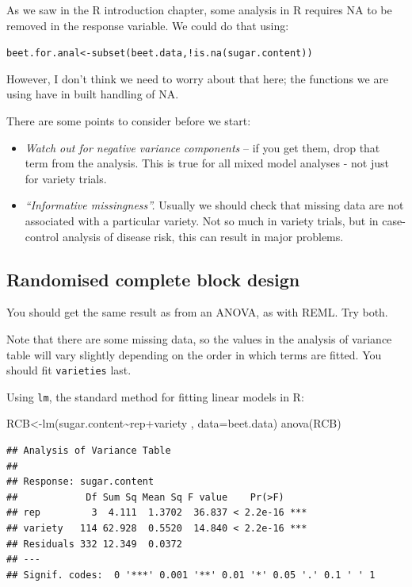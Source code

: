\documentclass[
]{book}
\newenvironment{Shaded}{\begin{snugshade}}{\end{snugshade}}
\newcommand{\AttributeTok}[1]{\textcolor[rgb]{0.77,0.63,0.00}{#1}}
\newcommand{\FunctionTok}[1]{\textcolor[rgb]{0.00,0.00,0.00}{#1}}
\newcommand{\NormalTok}[1]{#1}
\newcommand{\OtherTok}[1]{\textcolor[rgb]{0.56,0.35,0.01}{#1}}
\newcommand{\SpecialCharTok}[1]{\textcolor[rgb]{0.00,0.00,0.00}{#1}}
\begin{document}
As we saw in the R introduction chapter, some analysis in R requires NA to be removed in the response variable. We could do that using:

\texttt{beet.for.anal\textless{}-subset(beet.data,!is.na(sugar.content))}

However, I don't think we need to worry about that here; the functions we are using have in built handling of NA.

There are some points to consider before we start:

\begin{itemize}
\item
  \emph{Watch out for negative variance components} -- if you get them, drop that term from the analysis. This is true for all mixed model analyses - not just for variety trials.
\item
  \emph{``Informative missingness''.} Usually we should check that missing data are not associated with a particular variety. Not so much in variety trials, but in case-control analysis of disease risk, this can result in major problems.
\end{itemize}

\hypertarget{randomised-complete-block-design}{%
\subsection{Randomised complete block design}\label{randomised-complete-block-design}}

You should get the same result as from an ANOVA, as with REML. Try both.

Note that there are some missing data, so the values in the analysis of variance table will vary slightly depending on the order in which terms are fitted. You should fit \texttt{varieties} last.

Using \texttt{lm}, the standard method for fitting linear models in R:

\begin{Shaded}
\begin{Highlighting}[]
\NormalTok{RCB}\OtherTok{\textless{}{-}}\FunctionTok{lm}\NormalTok{(sugar.content}\SpecialCharTok{\textasciitilde{}}\NormalTok{rep}\SpecialCharTok{+}\NormalTok{variety , }\AttributeTok{data=}\NormalTok{beet.data)}
\FunctionTok{anova}\NormalTok{(RCB)}
\end{Highlighting}
\end{Shaded}

\begin{verbatim}
## Analysis of Variance Table
## 
## Response: sugar.content
##            Df Sum Sq Mean Sq F value    Pr(>F)    
## rep         3  4.111  1.3702  36.837 < 2.2e-16 ***
## variety   114 62.928  0.5520  14.840 < 2.2e-16 ***
## Residuals 332 12.349  0.0372                      
## ---
## Signif. codes:  0 '***' 0.001 '**' 0.01 '*' 0.05 '.' 0.1 ' ' 1
\end{verbatim}
\end{document}
